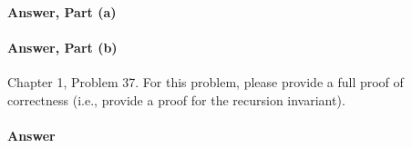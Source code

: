 \documentclass{article}
\begin{document}
\paragraph{Answer, Part (a)}

\todo{}

\paragraph{Answer, Part (b)}

\todo{}

\collab{\todo{}}

Chapter 1, Problem 37.  For this problem, please provide a full proof of
correctness (i.e., provide a proof for the recursion invariant).

\paragraph{Answer}
\todo{}
\end{document}
